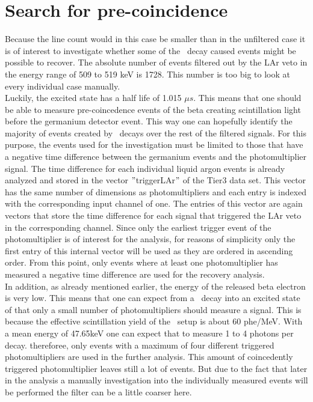 
\section{Search for pre-coincidence}
\label{sec:precoince}

Because the line count would in this case be smaller than in the unfiltered case it is of interest to investigate whether some of the \Kr\ decay caused events might be possible to recover.
The absolute number of events filtered out by the LAr veto in the energy range of 509 to 519 keV is 1728.
This number is too big to look at every individual case manually.
\\

Luckily, the excited  state has a half life of 1.015 \(\unit{\mu s}\).
This means that one should be able to measure pre-coincedence events of the beta creating scintillation light before the germanium detector event.
This way one can hopefully identify the majority of events created by \Kr\ decays over the rest of the filtered signals.
For this purpose, the events used for the investigation must be limited to those that have a negative time difference between the germanium events and the photomultiplier signal.
The time difference for each individual liquid argon events is already analyzed and stored in the vector $"$triggerLAr$"$ of the Tier3 data set.
This vector has the same number of dimensions as photomultipliers and each entry is indexed with the corresponding input channel of one.
The entries of this vector are again vectors that store the time difference for each signal that triggered the LAr veto in the corresponding channel.
Since only the earliest trigger event of the photomultiplier is of interest for the analysis,  for reasons of simplicity only the first entry of this internal vector will be used as they are ordered in ascending order.
From this point, only events where at least one photomultiplier has measured a negative time difference are used for the recovery analysis.
\\

In addition, as already mentioned earlier, the energy of the released beta electron is very low.
This means that one can expect from a \Kr\ decay into an excited state of  that only a small number of photomultipliers should measure a signal.
This is because the effective scintillation yield of the \gerda\ setup is about 60 phe/MeV.
With a mean energy of 47.65keV one can expect that to measure 1 to 4 photons per decay.
thereforee, only events with a maximum of four different triggered photomultipliers are used in the further analysis.
This amount of coincedently triggered photomultiplier leaves still a lot of events.
But due to the fact that later in the analysis a manually investigation into the individually measured events will be performed the filter can be a little coarser here.
\\

